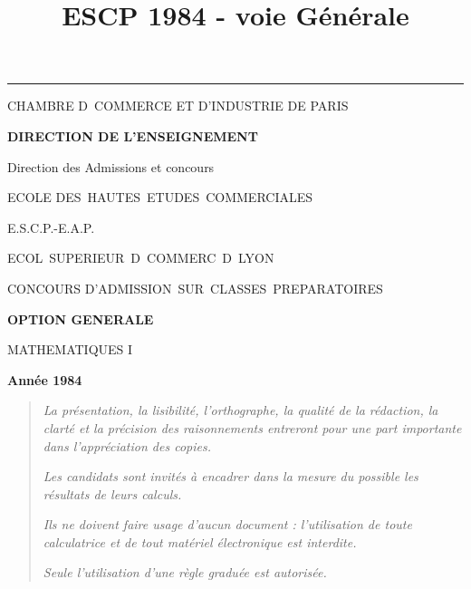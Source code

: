 \documentclass[11pt]{article}%
\title{\bf \vspace{-2cm} ESCP 1984 - voie Générale} %
\author{} %
\date{} %
\begin{document}
\maketitle %
\vspace{-1.4cm}\hrule %
\thispagestyle{fancy}

\vspace*{.2cm}




\begin{center}
{\small CHAMBRE D\E\ COMMERCE ET D'INDUSTRIE DE PARIS}

\textbf{DIRECTION DE L'ENSEIGNEMENT}

Direction des Admissions et concours

\underline{\hspace*{3cm}}

{\Large ECOLE DES\ HAUTES\ ETUDES\ COMMERCIALES}

{\Large E.S.C.P.-E.A.P.}

{\Large ECOL\E\ SUPERIEUR\E\ D\E\ COMMERC\E\ D\E\ LYON}{\large }

CONCOURS D'ADMISSION\ SUR\ CLASSES\ PREPARATOIRES

\underline{\hspace*{3cm}}

\textbf{OPTION GENERALE}

{\Large MATHEMATIQUES I}

\textbf{Année 1984}

\underline{\hspace*{3cm}}
\end{center}

\begin{quotation}
\noindent \textsl{La présentation, la lisibilité, l'orthographe, la
qualité
de la rédaction, la clarté et la précision des raisonnements entreront
pour
une part importante dans l'appréciation des copies.}

\noindent \textsl{Les candidats sont invités à encadrer dans la mesure
du
possible les résultats de leurs calculs.}

\noindent \textsl{Ils ne doivent faire usage d'aucun document :
l'utilisation de toute calculatrice et de tout matériel électronique
est
interdite.}

\noindent \textsl{Seule l'utilisation d'une règle graduée est
autorisée.}

\noindent \textsl{\hrulefill }
\end{quotation}
\end{document}
